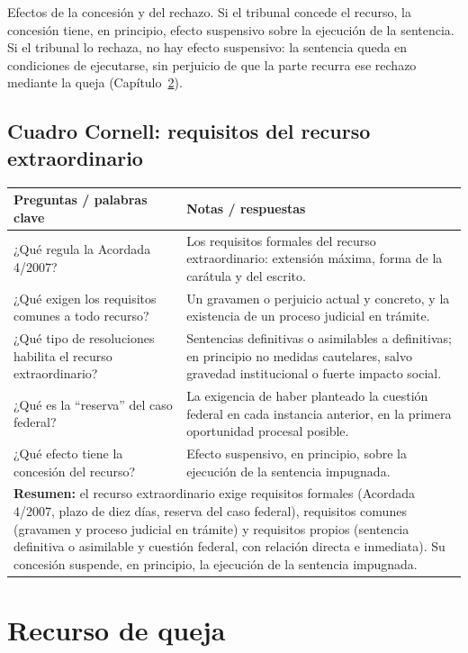 \documentclass[12pt,oneside]{book}
\begin{document}
\begin{impbox}
Efectos de la concesión y del rechazo. Si el tribunal concede el recurso, la
concesión tiene, en principio, efecto suspensivo sobre la ejecución de la
sentencia. Si el tribunal lo rechaza, no hay efecto suspensivo: la sentencia queda
en condiciones de ejecutarse, sin perjuicio de que la parte recurra ese rechazo
mediante la queja (Capítulo~\ref{cap:p9}).
\end{impbox}

\section{Cuadro Cornell: requisitos del recurso extraordinario}

\begin{longtable}{@{}p{}p{}@{}}
\toprule
\textbf{Preguntas / palabras clave} & \textbf{Notas / respuestas} \\
\midrule
\endhead
¿Qué regula la Acordada 4/2007? & Los requisitos formales del recurso
extraordinario: extensión máxima, forma de la carátula y del escrito. \\
¿Qué exigen los requisitos comunes a todo recurso? & Un gravamen o perjuicio
actual y concreto, y la existencia de un proceso judicial en trámite. \\
¿Qué tipo de resoluciones habilita el recurso extraordinario? & Sentencias
definitivas o asimilables a definitivas; en principio no medidas cautelares,
salvo gravedad institucional o fuerte impacto social. \\
¿Qué es la ``reserva'' del caso federal? & La exigencia de haber planteado la
cuestión federal en cada instancia anterior, en la primera oportunidad procesal
posible. \\
¿Qué efecto tiene la concesión del recurso? & Efecto suspensivo, en principio,
sobre la ejecución de la sentencia impugnada. \\
\midrule
\multicolumn{2}{p{0.95\textwidth}}{\textbf{Resumen:} el recurso extraordinario
exige requisitos formales (Acordada 4/2007, plazo de diez días, reserva del caso
federal), requisitos comunes (gravamen y proceso judicial en trámite) y
requisitos propios (sentencia definitiva o asimilable y cuestión federal, con
relación directa e inmediata). Su concesión suspende, en principio, la ejecución
de la sentencia impugnada.} \\
\bottomrule
\end{longtable}


\chapter{Recurso de queja}
\label{cap:p9}
\end{document}
